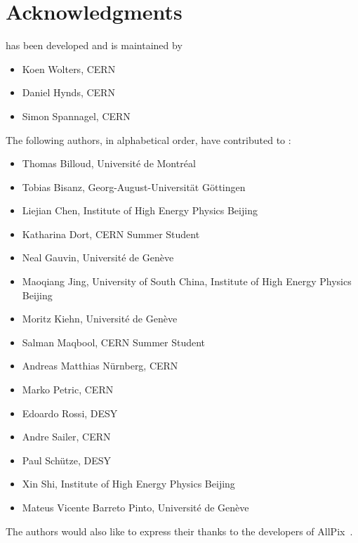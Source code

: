 \chapter{Acknowledgments}

\apsq has been developed and is maintained by

\begin{itemize}
\item Koen Wolters, CERN
\item Daniel Hynds, CERN
\item Simon Spannagel, CERN
\end{itemize}

The following authors, in alphabetical order, have contributed to \apsq:

\begin{itemize}
\item Thomas Billoud, Université de Montréal
\item Tobias Bisanz, Georg-August-Universität Göttingen
\item Liejian Chen, Institute of High Energy Physics Beijing
\item Katharina Dort, CERN Summer Student
\item Neal Gauvin, Université de Genève
\item Maoqiang Jing, University of South China, Institute of High Energy Physics Beijing
\item Moritz Kiehn, Université de Genève
\item Salman Maqbool, CERN Summer Student
\item Andreas Matthias Nürnberg, CERN
\item Marko Petric, CERN
\item Edoardo Rossi, DESY
\item Andre Sailer, CERN
\item Paul Schütze, DESY
\item Xin Shi, Institute of High Energy Physics Beijing
\item Mateus Vicente Barreto Pinto, Université de Genève
\end{itemize}

The authors would also like to express their thanks to the developers of AllPix~\cite{ap1wiki,ap1git}.
